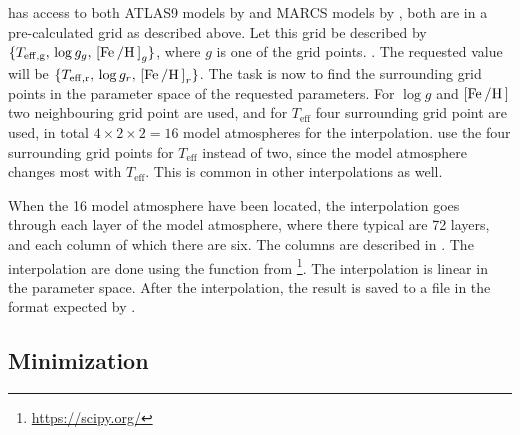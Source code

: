 \FASMA has access to both ATLAS9 models by \citet{Kurucz1993} and MARCS models by
\citet{Gustafson2008}, both are in a pre-calculated grid as described above. Let
this grid be described by $\{T_\mathrm{eff,g},\,\log
g_g,\,[\ion{Fe}/\ion{H}]_g\}$, where $g$ is one of the grid points.
. The requested value will
be $\{T_\mathrm{eff,r},\,\log g_r,\,[\ion{Fe}/\ion{H}]_r\}$. The task is now to
find the surrounding grid points in the parameter space of the requested
parameters. For $\log g$ and $[\ion{Fe}/\ion{H}]$ two neighbouring grid point
are used, and for $T_\mathrm{eff}$ four surrounding grid point are used, in
total $4\times2\times2=16$ model atmospheres for the interpolation. \FASMA use
the four surrounding grid points for $T_\mathrm{eff}$ instead of two, since the
model atmosphere changes most with $T_\mathrm{eff}$. This is common in other
interpolations as well.

When the 16 model atmosphere have been located, the interpolation goes through
each layer of the model atmosphere, where there typical are 72 layers, and each
column of which there are six. The columns are described in
. The interpolation are done using the
 function from \footnote{\url{https://scipy.org/}}.
The interpolation is linear in the parameter space. After the interpolation, the
result is saved to a file in the format expected by \MOOG.






\subsection{Minimization}

